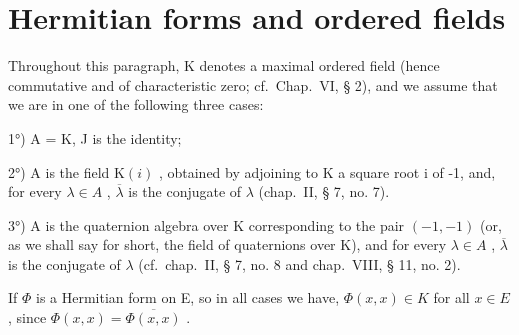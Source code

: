 \section{Hermitian forms and ordered fields}

Throughout this paragraph, K denotes a maximal ordered field (hence commutative and of characteristic zero; cf.~Chap.~VI, § 2), and we assume that we are in one of the following three cases:

1°) A = K, J is the identity;

2°) A is the field \(\mathrm{K}(i)\) , obtained by adjoining to K a square root i of -1, and, for every \(\lambda \in A\) , \(\overline{\lambda}\) is the conjugate of \(\lambda\) (chap.~II, § 7, no. 7).

3°) A is the quaternion algebra over K corresponding to the pair \((-1,-1)\) (or, as we shall say for short, the field of quaternions over K), and for every \(\lambda\in A\) , \(\overline{\lambda}\) is the conjugate of \(\lambda\) (cf.~chap.~II, § 7, no. 8 and chap.~VIII, § 11, no. 2).

If \(\Phi\) is a Hermitian form on E, so in all cases we have, \(\Phi(x, x) \in K\) for all \(x \in E\) , since \(\Phi(x, x) = \overline{\Phi(x, x)}\) .

